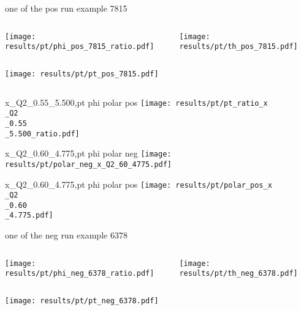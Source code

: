 \begin{frame}{one of the pos run example 7815}
\begin{columns}
\begin{column}[T]{0.5\textwidth}
\texttt{[image: results/pt/phi\_pos\_7815\_ratio.pdf]}
\end{column}
\begin{column}[T]{0.5\textwidth}
\texttt{[image: results/pt/th\_pos\_7815.pdf]}
\end{column}
\end{columns}
\begin{columns}
\begin{column}[T]{0.5\textwidth}
\texttt{[image: results/pt/pt\_pos\_7815.pdf]}
\end{column}
\begin{column}[T]{0.5\textwidth}
\end{column}
\end{columns}
\end{frame}
\begin{frame}{x\_Q2\_0.55\_5.500,pt phi polar pos}
\texttt{[image: results/pt/pt\_ratio\_x\\\_Q2\\\_0.55\\\_5.500\_ratio.pdf]}
\end{frame}
\begin{frame}{x\_Q2\_0.60\_4.775,pt phi polar neg}
\texttt{[image: results/pt/polar\_neg\_x\_Q2\_60\_4775.pdf]}
\end{frame}
\begin{frame}{x\_Q2\_0.60\_4.775,pt phi polar pos}
\texttt{[image: results/pt/polar\_pos\_x\\\_Q2\\\_0.60\\\_4.775.pdf]}
\end{frame}
\begin{frame}{one of the neg run example 6378}
\begin{columns}
\begin{column}[T]{0.5\textwidth}
\texttt{[image: results/pt/phi\_neg\_6378\_ratio.pdf]}
\end{column}
\begin{column}[T]{0.5\textwidth}
\texttt{[image: results/pt/th\_neg\_6378.pdf]}
\end{column}
\end{columns}
\texttt{[image: results/pt/pt\_neg\_6378.pdf]}
\end{frame}
